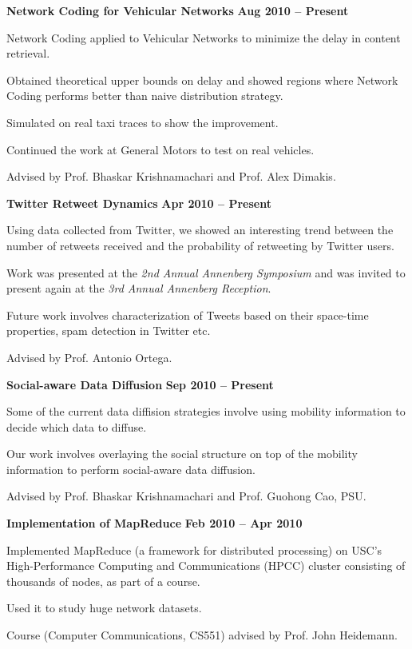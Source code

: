 \documentclass[margin,line]{resume}
\begin{document}
\begin{resume}
  \textbf{Network Coding for Vehicular Networks} \hfill \textbf{Aug 2010 -- Present}
  \begin{list2}
   \item Network Coding applied to Vehicular Networks to minimize the delay in content retrieval. 
   \item Obtained theoretical upper bounds on delay and showed regions where Network Coding performs better than naive distribution strategy.
   \item Simulated on real taxi traces to show the improvement.
   \item Continued the work at General Motors to test on real vehicles. 
   \item Advised by Prof. Bhaskar Krishnamachari and Prof. Alex Dimakis. 
  \end{list2}
  
  \textbf{Twitter Retweet Dynamics} \hfill \textbf{Apr 2010 -- Present}
  \begin{list2}
   \item Using data collected from Twitter, we showed an interesting trend between the number of retweets received and the probability of retweeting by Twitter users. 
   \item Work was presented at the \textsl{2nd Annual Annenberg Symposium} and was invited to present again at the \textsl{3rd Annual Annenberg Reception}.
   \item Future work involves characterization of Tweets based on their space-time properties, spam detection in Twitter etc. 
   \item Advised by Prof. Antonio Ortega.
  \end{list2}

  \textbf{Social-aware Data Diffusion} \hfill \textbf{Sep 2010 -- Present}
  \begin{list2}
   \item Some of the current data diffision strategies involve using mobility information to decide which data to diffuse. 
   \item Our work involves overlaying the social structure on top of the mobility information to perform social-aware data diffusion.
   \item Advised by Prof. Bhaskar Krishnamachari and Prof. Guohong Cao, PSU.
  \end{list2}
  \newpage
  \textbf{Implementation of MapReduce} \hfill \textbf{Feb 2010 -- Apr 2010}
  \begin{list2}
  \item Implemented MapReduce (a framework for distributed processing) on USC's High-Performance Computing and Communications (HPCC) cluster consisting of thousands of nodes, as part of a course. 
  \item Used it to study huge network datasets. 
  \item Course (Computer Communications, CS551) advised by Prof. John Heidemann. 
  \end{list2}
 

\end{resume}
\end{document}
